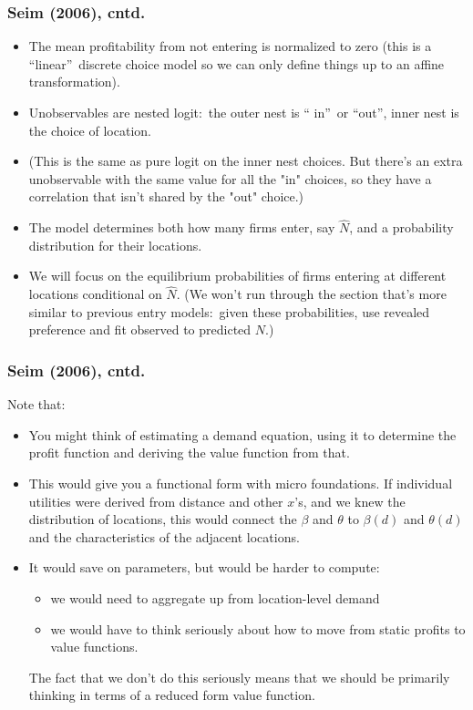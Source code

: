 \begin{frame}
\frametitle{Seim (2006), cntd.}
\footnotesize
\begin{itemize}
\item The mean profitability from not entering is normalized to zero (this
is a \textquotedblleft linear\textquotedblright\ discrete choice model so we
can only define things up to an affine transformation).
\item Unobservables are nested logit:\ the outer nest is \textquotedblleft
in\textquotedblright\ or \textquotedblleft out\textquotedblright , inner
nest is the choice of location.
\item (This is the same as pure logit on the inner nest choices. But there's
an extra unobservable with the same value for all the "in" choices, so they
have a correlation that isn't shared by the "out" choice.)
\item The model determines both how many firms enter, say $\hat{N}$, and a
probability distribution for their locations.
\item We will focus on the equilibrium probabilities of firms entering at
different locations conditional on $\hat{N}$. (We won't run through the
section that's more similar to previous entry models:\ given these
probabilities, use revealed preference and fit observed to predicted $N$.)
\end{itemize}
\end{frame}

\begin{frame}
\frametitle{Seim (2006), cntd.}
\footnotesize
Note that:
\begin{itemize}
\item You might think of estimating a demand equation, using it to determine
the profit function and deriving the value function from that.
\item This would give you a functional form with micro foundations. If
individual utilities were derived from distance and other $x$'s, and we knew
the distribution of locations, this would connect the $\beta $ and $\theta $
to $\beta (d)$ and $\theta (d)$ and the characteristics of the adjacent
locations.
\item It would save on parameters, but would be harder to compute:
\begin{itemize}
\item we would need to aggregate up from location-level demand
\item we would have to think seriously about how to move from static profits
to value functions.
\end{itemize}
The fact that we don't do this seriously means that we should be primarily
thinking in terms of a reduced form value function.
\end{itemize}
\end{frame}

